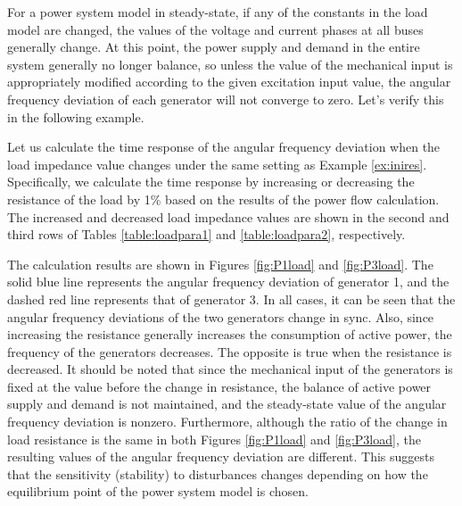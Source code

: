 \documentclass[graybox, envcountchap]{svmult}
\begin{document}
For a power system model in steady-state, if any of the constants in the load
model are changed, the values of the voltage and current phases at all buses
generally change. At this point, the power supply and demand in the entire
system generally no longer balance, so unless the value of the mechanical input
is appropriately modified according to the given excitation input value, the
angular frequency deviation of each generator will not converge to zero. Let's
verify this in the following example.

\begin{example}\label{ex:loadpv}

Let us calculate the time response of the angular frequency deviation when the
load impedance value changes under the same setting as Example \ref{ex:inires}.
Specifically, we calculate the time response by increasing or decreasing
the resistance of the load by 1\% based on the results of the power flow
calculation. The increased and decreased load impedance values are shown in the
second and third rows of Tables \ref{table:loadpara1} and \ref{table:loadpara2},
respectively.

The calculation results are shown in Figures \ref{fig:P1load} and
\ref{fig:P3load}. The solid blue line represents the angular frequency
deviation of generator 1, and the dashed red line represents that of generator
3. In all cases, it can be seen that the angular frequency deviations of the two
generators change in sync. Also, since increasing the resistance generally
increases the consumption of active power, the frequency of the generators
decreases. The opposite is true when the resistance is decreased. It should be
noted that since the mechanical input of the generators is fixed at the value
before the change in resistance, the balance of active power supply and demand
is not maintained, and the steady-state value of the angular frequency deviation
is nonzero. Furthermore, although the ratio of the change in load resistance is
the same in both Figures \ref{fig:P1load} and \ref{fig:P3load}, the resulting
values of the angular frequency deviation are different. This suggests that the
sensitivity (stability) to disturbances changes depending on how the equilibrium
point of the power system model is chosen.

\end{example}
\end{document}
